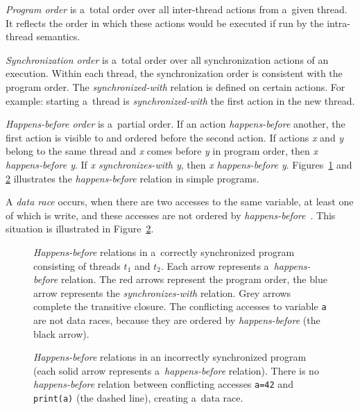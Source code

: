 \emph{Program order} is a~total order over all inter-thread actions from a~given
thread. It reflects the order in which these actions would be executed if
run by the intra-thread semantics.

\emph{Synchronization order} is a~total order over all synchronization actions
of an execution. Within each thread, the synchronization order is consistent
with the program order. The \emph{synchronized-with} relation is defined on
certain actions. For example: starting a~thread is \emph{synchronized-with}
the first action in the new thread.

\emph{Happens-before order} is a~partial order. If an action
\emph{happens-before} another, the first action is visible to and ordered before
the second action. If actions \emph{x} and \emph{y} belong to the same thread
and \emph{x} comes before \emph{y} in program order, then \emph{x happens-before
y}.  If \emph{x synchronizes-with y}, then \emph{x happens-before y}.
Figures~\ref{hb1} and \ref{hb2} illustrates the \emph{happens-before} relation
in simple programs.

A \emph{data race} occurs, when there are two accesses to the same variable, at
least one of which is write, and these accesses are not ordered by
\emph{happens-before}~\cite{jmmspec}. This situation is illustrated in
Figure~\ref{hb2}.

\begin{figure}[H]
    \label{hb1}
    
    \caption{\emph{Happens-before} relations in a~correctly synchronized program
    consisting of threads $t_1$ and $t_2$. Each arrow represents
    a~\emph{happens-before} relation. The red arrows represent the program
    order, the blue arrow represents the \emph{synchronizes-with} relation. Grey
    arrows complete the transitive closure. The conflicting accesses to variable
    \texttt{a} are not data races, because they are ordered by
    \emph{happens-before} (the black arrow).}
\end{figure}

\begin{figure}[H]
    \label{hb2}
    
    \caption{\emph{Happens-before} relations in an incorrectly synchronized
    program (each solid arrow represents a~\emph{happens-before} relation).
    There is no \emph{happens-before} relation between conflicting accesses
    \texttt{a=42} and \texttt{print(a)} (the dashed line), creating a~data
    race.}
\end{figure}


